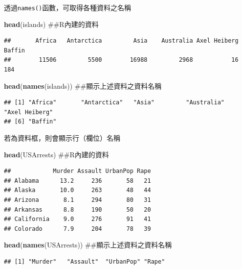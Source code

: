 \documentclass[]{book}
\newenvironment{Shaded}{\begin{snugshade}}{\end{snugshade}}
\newcommand{\KeywordTok}[1]{\textcolor[rgb]{0.13,0.29,0.53}{\textbf{{#1}}}}
\newcommand{\NormalTok}[1]{{#1}}
\theoremstyle{definition}
\theoremstyle{definition}
\theoremstyle{remark}
\begin{document}
透過\texttt{names()}函數，可取得各種資料之名稱

\begin{Shaded}
\begin{Highlighting}[]
\KeywordTok{head}\NormalTok{(islands) ##R內建的資料}
\end{Highlighting}
\end{Shaded}

\begin{verbatim}
##       Africa   Antarctica         Asia    Australia Axel Heiberg       Baffin 
##        11506         5500        16988         2968           16          184
\end{verbatim}

\begin{Shaded}
\begin{Highlighting}[]
\KeywordTok{head}\NormalTok{(}\KeywordTok{names}\NormalTok{(islands)) ##顯示上述資料之資料名稱}
\end{Highlighting}
\end{Shaded}

\begin{verbatim}
## [1] "Africa"       "Antarctica"   "Asia"         "Australia"    "Axel Heiberg"
## [6] "Baffin"
\end{verbatim}

若為資料框，則會顯示行（欄位）名稱

\begin{Shaded}
\begin{Highlighting}[]
\KeywordTok{head}\NormalTok{(USArrests) ##R內建的資料}
\end{Highlighting}
\end{Shaded}

\begin{verbatim}
##            Murder Assault UrbanPop Rape
## Alabama      13.2     236       58   21
## Alaska       10.0     263       48   44
## Arizona       8.1     294       80   31
## Arkansas      8.8     190       50   20
## California    9.0     276       91   41
## Colorado      7.9     204       78   39
\end{verbatim}

\begin{Shaded}
\begin{Highlighting}[]
\KeywordTok{head}\NormalTok{(}\KeywordTok{names}\NormalTok{(USArrests)) ##顯示上述資料之資料名稱}
\end{Highlighting}
\end{Shaded}

\begin{verbatim}
## [1] "Murder"   "Assault"  "UrbanPop" "Rape"
\end{verbatim}
\end{document}
